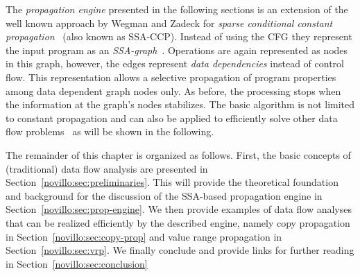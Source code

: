 The \emph{propagation engine} presented in the following sections is an
extension of the well known approach by Wegman and Zadeck for \emph{sparse
conditional constant propagation}~\cite{bib:wegman.ea-91} (also known as
SSA-CCP). Instead of using the CFG they represent the input program as an
\emph{SSA-graph}~\cite{novillo:bib:CFRWZ91}. Operations are again represented as
nodes in this graph, however, the edges represent \emph{data dependencies}
instead of control flow. This representation allows a selective propagation of
program properties among data dependent graph nodes only. As before, the
processing stops when the information at the graph's nodes stabilizes. The basic
algorithm is not limited to constant propagation and can also be applied to
efficiently solve other data flow problems~\cite{novillo:bib:N05} as will be
shown in the following.

The remainder of this chapter is organized as follows. First, the basic concepts
of (traditional) data flow analysis are presented in
Section~\ref{novillo:sec:preliminaries}. This will provide the theoretical
foundation and background for the discussion of the SSA-based propagation
engine in Section~\ref{novillo:sec:prop-engine}. We then provide examples of
data flow analyses that can be realized efficiently by the described engine,
namely copy propagation in Section~\ref{novillo:sec:copy-prop} and value range
propagation in Section~\ref{novillo:sec:vrp}. We finally conclude and provide
links for further reading in Section~\ref{novillo:sec:conclusion}


